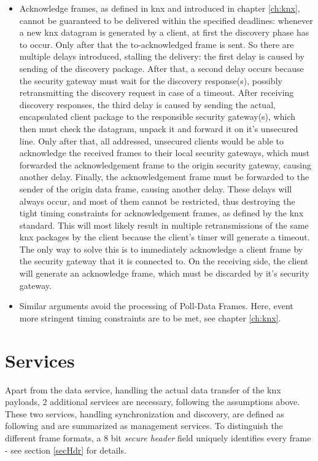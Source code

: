 \begin{itemize}
 \item Acknowledge frames, as defined in \gls{knx} and introduced in chapter \ref{ch:knx}, cannot be guaranteed to be delivered within the specified deadlines: whenever
 a new \gls{knx} datagram is generated by a client, at first the discovery phase has to occur. Only after that the to-acknowledged frame is sent. So there are
 multiple delays introduced, stalling the delivery: the first delay is caused by sending of the discovery package.
 After that, a second delay occurs because the security gateway must wait for the discovery response(s), possibly retransmitting the discovery request
 in case of a timeout. After receiving discovery responses, the third delay is caused by sending the actual, encapsulated
 client package to the responsible security gateway(s), which then must check the datagram, unpack it and forward it on it's unsecured line.
 Only after that, all addressed, unsecured clients would be able to acknowledge the received frames
 to their local security gateways,
 which must forwarded the acknowledgement frame to the origin security gateway, causing another delay. Finally, the acknowledgement frame must be forwarded to the sender of
 the origin data frame, causing another delay.
 These delays will always occur, and most of them cannot be restricted, thus destroying the tight timing constraints for acknowledgement frames, as defined
 by the \gls{knx} standard. This
 will most likely result in multiple retransmissions of the same \gls{knx} packages
 by the client because the client's timer will generate a timeout. The only way to solve this is to immediately acknowledge a client frame by the security
 gateway that it is connected to. On the receiving side, the client will generate an acknowledge
 frame, which must be discarded by it's security gateway.
 \item Similar arguments avoid the processing of Poll-Data Frames. Here, event more stringent timing constraints are to be met, see chapter \ref{ch:knx}. 
\end{itemize}

\section{Services}

Apart from the data service, handling the actual data transfer of the \gls{knx} payloads, 2 additional services are necessary, following the assumptions above.
These two services, handling synchronization and discovery, are defined as following and are summarized as management services. To distinguish the different
frame formats, a 8 bit \textit{secure header} field uniquely identifies every frame - see section \ref{secHdr} for details.

